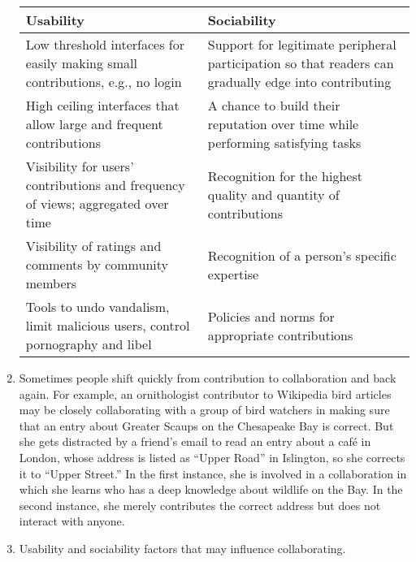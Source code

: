 \documentclass[11pt]{scrartcl}
\begin{document}
\begin{enumerate}
		\begin{tabular}{ | p{6,5cm} | p{} |}
			\hline
			Usability & Sociability\\ \hline
			Low threshold interfaces for easily making small contributions, e.g., no login & Support for legitimate peripheral participation so that readers can gradually edge into contributing\\ \hline
			High ceiling interfaces that allow large and frequent contributions & A chance to build their reputation over time while performing satisfying tasks\\ \hline
			Visibility for users’ contributions and frequency of views; aggregated over time & Recognition for the highest quality and quantity of contributions\\ \hline
			Visibility of ratings and comments by community members & Recognition of a person’s specific expertise\\ \hline
			Tools to undo vandalism, limit malicious users, control pornography and libel & Policies and norms for appropriate contributions\\ \hline
		\end{tabular}

		\item Sometimes people shift quickly from contribution to collaboration and back again. For example, an ornithologist contributor to Wikipedia bird articles may be closely collaborating with a group of bird watchers in making sure that an entry about Greater Scaups on the Chesapeake Bay is correct. But she gets distracted by a friend’s email to read an entry about a café in London, whose address is listed as “Upper Road” in Islington, so she corrects it to “Upper Street.” In the first instance, she is involved in a collaboration in which she learns who has a deep knowledge about wildlife on the Bay. In the second instance, she merely contributes the correct address but does not interact with anyone.

		\item Usability and sociability factors that may influence collaborating.\\


\end{enumerate}
\end{document}
